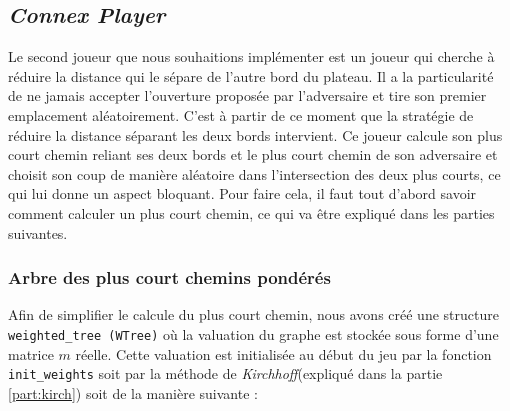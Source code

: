 \documentclass[a4paper, 12pt]{article}
\begin{document}
\subsection{\emph{Connex Player}}
Le second joueur que nous souhaitions implémenter est un joueur qui cherche à réduire la distance qui le sépare de l'autre bord du plateau. Il a la particularité de ne jamais accepter l'ouverture proposée par l'adversaire et tire son premier emplacement aléatoirement. C'est à partir de ce moment que la stratégie de réduire la distance séparant les deux bords intervient. Ce joueur calcule son plus court chemin reliant ses deux bords et le plus court chemin de son adversaire et choisit son coup de manière aléatoire dans l'intersection des deux plus courts, ce qui lui donne un aspect bloquant.
Pour faire cela, il faut tout d'abord savoir comment calculer un plus court chemin, ce qui va être expliqué dans les parties suivantes.

\subsubsection{Arbre des plus court chemins pondérés}
Afin de simplifier le calcule du plus court chemin, nous avons créé une structure \texttt{weighted\_tree (WTree)} où la valuation du graphe est stockée sous forme d'une matrice $m$ réelle. Cette valuation est initialisée au début du jeu par la fonction \texttt{init\_weights} soit par la méthode de \emph{Kirchhoff}(expliqué dans la partie \ref{part:kirch}) soit de la manière suivante :\\
\end{document}
